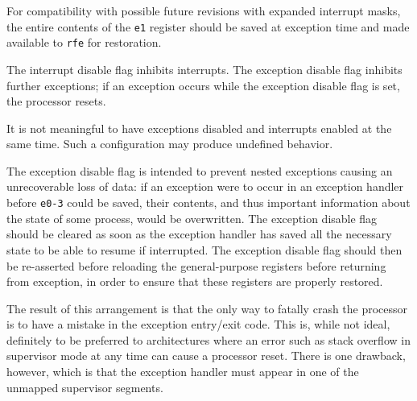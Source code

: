 For compatibility with possible future revisions with expanded
interrupt masks, the entire contents of the {\tt e1} register should
be saved at exception time and made available to {\tt rfe} for
restoration.

The interrupt disable flag inhibits interrupts.  The exception disable
flag inhibits further exceptions; if an exception occurs while the
exception disable flag is set, the processor resets.

It is not meaningful to have exceptions disabled and interrupts
enabled at the same time.  Such a configuration may produce undefined
behavior.

The exception disable flag is intended to prevent nested exceptions
causing an unrecoverable loss of data:  if an exception were to occur
in an exception handler before {\tt e0-3} could be saved, their
contents, and thus important information about the state of some
process, would be overwritten.  The exception disable flag should be
cleared as soon as the exception handler has saved all the necessary
state to be able to resume if interrupted.  The exception disable
flag should then be re-asserted before reloading the general-purpose
registers before returning from exception, in order to ensure that these
registers are properly restored.

The result of this arrangement is that the only way to fatally crash
the processor is to have a mistake in the exception entry/exit code. 
This is, while not ideal, definitely to be preferred to architectures
where an error such as stack overflow in supervisor mode at any time
can cause a processor reset.  There is one drawback, however, which is
that the exception handler must appear in one of the unmapped
supervisor segments.


